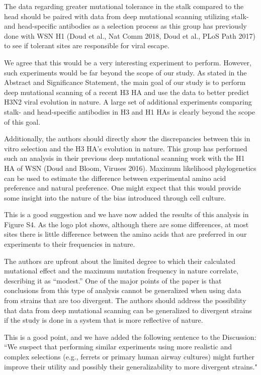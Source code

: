 \documentclass[11pt, oneside]{article}   	%
\newcommand{\response}[1]{{\color{black}#1}}
\begin{document}
The data regarding greater mutational tolerance in the stalk compared to the head should be paired with data from deep mutational scanning utilizing stalk- and head-specific antibodies as a selection process as this group has previously done with WSN H1 (Doud et al., Nat Comm 2018, Doud et al., PLoS Path 2017) to see if tolerant sites are responsible for viral escape. 

\response{We agree that this would be a very interesting experiment to perform.
However, such experiments would be far beyond the scope of our study.
As stated in the Abstract and Significance Statement, the main goal of our study is to perform deep mutational scanning of a recent H3 HA and use the data to better predict H3N2 viral evolution in nature.
A large set of additional experiments comparing stalk- and head-specific antibodies in H3 and H1 HAs is clearly beyond the scope of this goal.
}

Additionally, the authors should directly show the discrepancies between this in vitro selection and the H3 HA's evolution in nature. This group has performed such an analysis in their previous deep mutational scanning work with the H1 HA of WSN (Doud and Bloom, Viruses 2016). Maximum likelihood phylogenetics can be used to estimate the difference between experimental amino acid preference and natural preference. One might expect that this would provide some insight into the nature of the bias introduced through cell culture. 

\response{This is a good suggestion and we have now added the results of this analysis in Figure S4.
As the logo plot shows, although there are some differences, at most sites there is little difference between the amino acids that are preferred in our experiments to their frequencies in nature.
}

The authors are upfront about the limited degree to which their calculated mutational effect and the maximum mutation frequency in nature correlate, describing it as ``modest.'' One of the major points of the paper is that conclusions from this type of analysis cannot be generalized when using data from strains that are too divergent. The authors should address the possibility that data from deep mutational scanning can be generalized to divergent strains if the study is done in a system that is more reflective of nature. 

\response{This is a good point, and we have added the following sentence to the Discussion: ``We suspect that performing similar experiments using more realistic and complex selections (e.g., ferrets or primary human airway cultures) might further improve their utility and possibly their generalizability to more divergent strains."}
\end{document}
